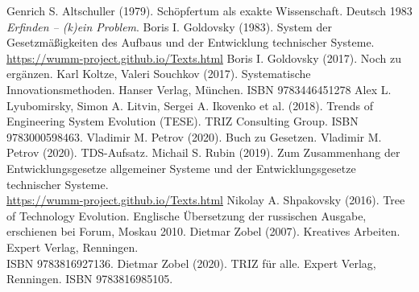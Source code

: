 \documentclass[11pt,a4paper]{article}
\begin{document}
\begin{thebibliography}{xxx}
 Genrich S. Altschuller (1979).  Schöpfertum als
  exakte Wissenschaft.  Deutsch 1983 \emph{Erfinden -- (k)ein Problem}.
 Boris I. Goldovsky (1983). System der
  Gesetzmäßigkeiten des Aufbaus und der Entwicklung technischer Systeme.
  \url{https://wumm-project.github.io/Texts.html}
 Boris I. Goldovsky (2017). Noch zu ergänzen. 
 Karl Koltze, Valeri Souchkov (2017).
  Systematische Innovationsmethoden.  Hanser Verlag, München. ISBN
  9783446451278
 Alex L. Lyubomirsky, Simon A. Litvin, Sergei A. Ikovenko et
  al. (2018). Trends of Engineering System Evolution (TESE).  TRIZ Consulting
  Group. ISBN 9783000598463.
 Vladimir M. Petrov (2020). Buch zu Gesetzen.
 Vladimir M. Petrov (2020). TDS-Aufsatz.
 Michail S. Rubin (2019). Zum Zusammenhang der
  Entwicklungsgesetze allgemeiner Systeme und der Entwicklungsgesetze
  technischer Systeme. \\ \url{https://wumm-project.github.io/Texts.html}
 Nikolay A. Shpakovsky (2016). Tree of Technology
  Evolution. Englische Übersetzung der russischen Ausgabe, erschienen bei
  Forum, Moskau 2010.
 Dietmar Zobel (2007). Kreatives Arbeiten. Expert Verlag,
  Renningen.\\ ISBN 9783816927136.
 Dietmar Zobel (2020). TRIZ für alle. Expert Verlag,
  Renningen. ISBN 9783816985105.
\end{thebibliography}
\end{document}
